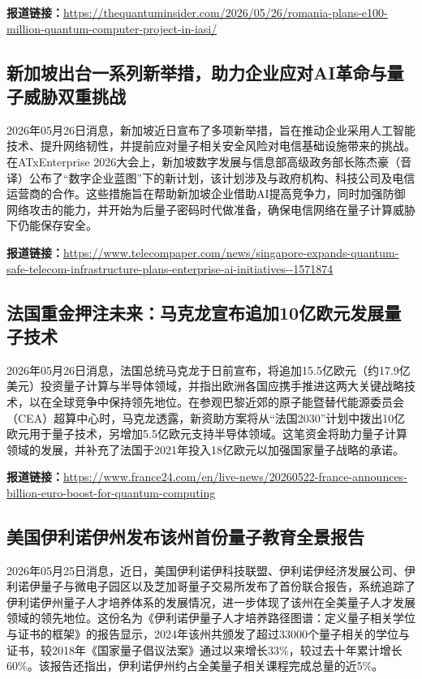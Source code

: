 \documentclass[12pt,a4paper]{ctexart}
\begin{document}
\noindent\textbf{报道链接：}\url{https://thequantuminsider.com/2026/05/26/romania-plans-e100-million-quantum-computer-project-in-iasi/ }

\subsection{ 新加坡出台一系列新举措，助力企业应对AI革命与量子威胁双重挑战 }

2026年05月26日消息，新加坡近日宣布了多项新举措，旨在推动企业采用人工智能技术、提升网络韧性，并提前应对量子相关安全风险对电信基础设施带来的挑战。在ATxEnterprise 2026大会上，新加坡数字发展与信息部高级政务部长陈杰豪（音译）公布了“数字企业蓝图”下的新计划，该计划涉及与政府机构、科技公司及电信运营商的合作。这些措施旨在帮助新加坡企业借助AI提高竞争力，同时加强防御网络攻击的能力，并开始为后量子密码时代做准备，确保电信网络在量子计算威胁下仍能保存安全。

\noindent\textbf{报道链接：}\url{https://www.telecompaper.com/news/singapore-expands-quantum-safe-telecom-infrastructure-plans-enterprise-ai-initiatives--1571874 }

\subsection{ 法国重金押注未来：马克龙宣布追加10亿欧元发展量子技术 }

2026年05月26日消息，法国总统马克龙于日前宣布，将追加15.5亿欧元（约17.9亿美元）投资量子计算与半导体领域，并指出欧洲各国应携手推进这两大关键战略技术，以在全球竞争中保持领先地位。在参观巴黎近郊的原子能暨替代能源委员会（CEA）超算中心时，马克龙透露，新资助方案将从“法国2030”计划中拨出10亿欧元用于量子技术，另增加5.5亿欧元支持半导体领域。这笔资金将助力量子计算领域的发展，并补充了法国于2021年投入18亿欧元以加强国家量子战略的承诺。

\noindent\textbf{报道链接：}\url{https://www.france24.com/en/live-news/20260522-france-announces-billion-euro-boost-for-quantum-computing }

\subsection{ 美国伊利诺伊州发布该州首份量子教育全景报告 }

2026年05月25日消息，近日，美国伊利诺伊科技联盟、伊利诺伊经济发展公司、伊利诺伊量子与微电子园区以及芝加哥量子交易所发布了首份联合报告，系统追踪了伊利诺伊州量子人才培养体系的发展情况，进一步体现了该州在全美量子人才发展领域的领先地位。这份名为《伊利诺伊量子人才培养路径图谱：定义量子相关学位与证书的框架》的报告显示，2024年该州共颁发了超过33000个量子相关的学位与证书，较2018年《国家量子倡议法案》通过以来增长33\%，较过去十年累计增长60\%。该报告还指出，伊利诺伊州约占全美量子相关课程完成总量的近5\%。
\end{document}
